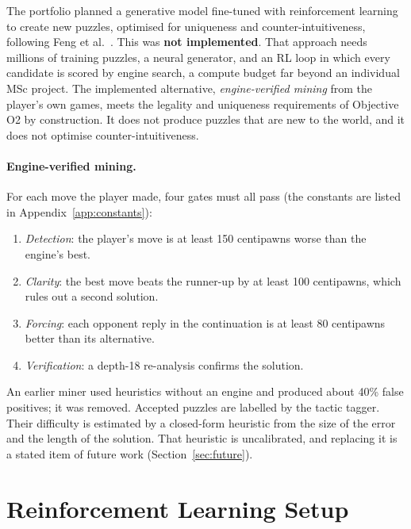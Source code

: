 \begin{honest}
The portfolio planned a generative model fine-tuned with reinforcement learning to create new puzzles,
optimised for uniqueness and counter-intuitiveness, following Feng et al.~\cite{feng2025generating}.
This was \textbf{not implemented}. That approach needs millions of training puzzles, a neural
generator, and an RL loop in which every candidate is scored by engine search, a compute budget far
beyond an individual MSc project. The implemented alternative, \emph{engine-verified mining} from the
player's own games, meets the legality and uniqueness requirements of Objective O2 by construction.
It does not produce puzzles that are new to the world, and it does not optimise
counter-intuitiveness.
\end{honest}

\paragraph{Engine-verified mining.} For each move the player made, four gates must all pass
(the constants are listed in Appendix~\ref{app:constants}):
\begin{enumerate}
  \item \emph{Detection}: the player's move is at least 150 centipawns worse than the engine's best.
  \item \emph{Clarity}: the best move beats the runner-up by at least 100 centipawns, which rules out
        a second solution.
  \item \emph{Forcing}: each opponent reply in the continuation is at least 80 centipawns better than
        its alternative.
  \item \emph{Verification}: a depth-18 re-analysis confirms the solution.
\end{enumerate}
An earlier miner used heuristics without an engine and produced about 40\% false positives; it was
removed. Accepted puzzles are labelled by the tactic tagger. Their difficulty is estimated by a
closed-form heuristic from the size of the error and the length of the solution. That heuristic is
uncalibrated, and replacing it is a stated item of future work (Section~\ref{sec:future}).

\section{Reinforcement Learning Setup}\label{sec:rl-setup}

